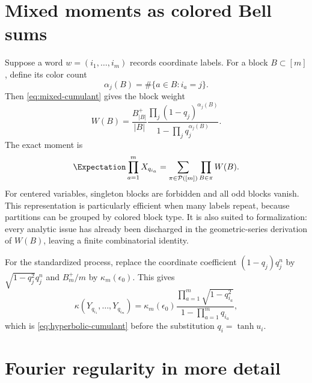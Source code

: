 \documentclass[11pt,a4paper]{article}
\theoremstyle{definition}
\theoremstyle{remark}
\newcommand{\cP}{\mathcal{P}}
\begin{document}
\section{Mixed moments as colored Bell sums}
\label{app:bell}

Suppose a word $w=(i_1,\ldots,i_m)$ records coordinate labels.  For a block $B\subset[m]$, define its color count
\begin{equation}
  \alpha_j(B)=\#\{a\in B:i_a=j\}.
  \label{eq:block-color}
\end{equation}
Then \eqref{eq:mixed-cumulant} gives the block weight
\begin{equation}
  W(B)=\frac{B_{|B|}^+}{|B|}
   \frac{\prod_j(1-q_j)^{\alpha_j(B)}}
        {1-\prod_jq_j^{\alpha_j(B)}}.
  \label{eq:block-weight}
\end{equation}
The exact moment is
\begin{equation}
  \Expectation\prod_{a=1}^mX_{q_{i_a}}
    =\sum_{\pi\in\cP([m])}\prod_{B\in\pi}W(B).
  \label{eq:colored-Bell}
\end{equation}
For centered variables, singleton blocks are forbidden and all odd blocks vanish.  This representation is particularly efficient when many labels repeat, because partitions can be grouped by colored block type.  It is also suited to formalization: every analytic issue has already been discharged in the geometric-series derivation of $W(B)$, leaving a finite combinatorial identity.

For the standardized process, replace the coordinate coefficient $(1-q_j)q_j^n$ by $\sqrt{1-q_j^2}q_j^n$ and $B_m^+/m$ by $\kappa_m(\epsilon_0)$.  This gives
\begin{equation}
 \kappa(Y_{q_{i_1}},\ldots,Y_{q_{i_m}})
  =\kappa_m(\epsilon_0)
   \frac{\prod_{a=1}^m\sqrt{1-q_{i_a}^2}}
        {1-\prod_{a=1}^mq_{i_a}},
 \label{eq:standardized-colored-cumulant}
\end{equation}
which is \eqref{eq:hyperbolic-cumulant} before the substitution $q_i=\tanh u_i$.

\section{Fourier regularity in more detail}
\label{app:fourier-regularity}
\end{document}
